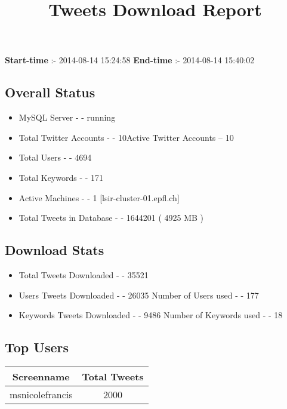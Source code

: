 \documentclass{article}\usepackage[T1]{fontenc}
\begin{document}
\title{\textbf{Tweets Download Report}}
               \date{}
                \maketitle
               \centerline{\textbf{Start-time} :- 2014-08-14 15:24:58 \hspace{40pt} \textbf{End-time} :- 2014-08-14 15:40:02}               \subsection*{Overall Status}                \begin{itemize}                \item MySQL Server - - running               \item Total Twitter Accounts - - 10\newline Active Twitter Accounts -- 10               \item Total Users - - 4694               \item Total Keywords - - 171               \item Active Machines - - 1 [lsir-cluster-01.epfl.ch]               \item Total Tweets in Database - - 1644201 ( 4925 MB )               \end{itemize}               \subsection*{Download Stats}                \begin{itemize}                \item Total Tweets Downloaded - - 35521               \item Users Tweets Downloaded - - 26035 \newline Number of Users used - - 177               \item Keywords Tweets Downloaded - - 9486 \newline Number of Keywords used - - 18              \end{itemize}              \subsection*{Top Users}\begin{tabular}{|c|c|}         \hline         Screenname & Total Tweets \\ 
 \hline
msnicolefrancis & 2000\\ 

\end{tabular}
\end{document}
